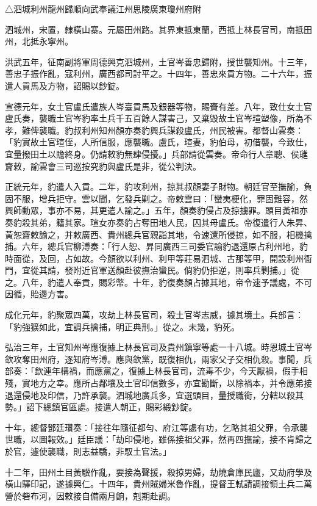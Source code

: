 
\begin{pinyinscope}
△泗城利州龍州歸順向武奉議江州思陵廣東瓊州府附

泗城州，宋置，隸橫山寨。元屬田州路。其界東抵東蘭，西抵上林長官司，南抵田州，北抵永寧州。

洪武五年，征南副將軍周德興克泗城州，土官岑善忠歸附，授世襲知州。十三年，善忠子振作亂，寇利州，廣西都司討平之。十四年，善忠來貢方物。二十六年，振遣人貢馬及方物，詔賜以鈔錠。

宣德元年，女土官盧氏遣族人岑臺貢馬及銀器等物，賜賚有差。八年，致仕女土官盧氏奏，襲職土官岑豹率土兵千五百餘人謀害己，又棄毀故土官岑瑄塑像，所為不孝，難俾襲職。豹叔利州知州顏亦奏豹興兵謀殺盧氏，州民被害。都督山雲奏：「豹實故土官瑄侄，人所信服，應襲職。盧氏，瑄妻，豹伯母，初借襲，今致仕，宜量撥田土以贍終身。仍請敕豹無肆侵擾。」兵部請從雲奏。帝命行人章聰、侯璡齎敕，諭雲會三司巡按究豹與盧氏是非，從公判決。

正統元年，豹遣人入貢。二年，豹攻利州，掠其叔顏妻子財物。朝廷官至撫諭，負固不服，增兵拒守。雲以聞，乞發兵剿之。帝敕雲曰：「蠻夷梗化，罪固難容，然興師動眾，事亦不易，其更遣人諭之。」五年，顏奏豹侵占及掠擄罪。頭目黃祖亦奏豹殺其弟，籍其家。瑄女亦奏豹占奪田地人民，囚其母盧氏。帝復遣行人朱昇、黃恕齋敕諭之，并敕廣西、貴州總兵官親詣其地，令速還所侵掠，如不服，相機擒捕。六年，總兵官柳溥奏：「行人恕、昇同廣西三司委官諭豹退還原占利州地，豹時面從，及回，占如故。今顏欲以利州、利甲等莊易泗城、古那等甲，開設利州衙門，宜從其請，發附近官軍送顏赴彼撫治蠻民。倘豹仍拒逆，則率兵剿捕。」從之。八年，豹遣人奉貢，賜彩幣。十年，豹復奏顏占據其地，帝令速予議處，不可因循，貽邊方害。

成化元年，豹聚眾四萬，攻劫上林長官司，殺土官岑志威，據其境土。兵部言：「豹強獷如此，宜調兵擒捕，明正典刑。」從之。未幾，豹死。

弘治三年，土官知州岑應復據上林長官司及貴州鎮寧等處一十八城。時恩城土官岑欽攻奪田州府，逐知府岑溥。應與欽黨，既復相仇，兩家父子交相仇殺。事聞，兵部奏：「欽連年構禍，而應黨之，復據上林長官司，流毒不少，今天厭禍，假手相殘，實地方之幸。應所占鄰壤及土官印信數多，亦宜勘斷，以除禍本，并令應弟接退還侵地及印信，乃許承襲。泗城地廣兵多，宜選頭目，量授職銜，分轄以殺其勢。」詔下總鎮官區處。接遣人朝正，賜彩緞鈔錠。

十年，總督鄧廷瓚奏：「接往年隨征都勻、府江等處有功，乞略其祖父罪，令承襲世職，以圖報效。」廷臣議：「劫印侵地，雖係接祖父罪，然再四撫諭，接不肯歸之於官，遽使襲職，則志益驕，非馭土官法。」

十二年，田州土目黃驥作亂，要接為聲援，殺掠男婦，劫燒倉庫民廬，又劫府學及橫山驛印記，遂據興仁。十四年，貴州賊婦米魯作亂，提督王軾請調接領土兵二萬營於砦布河，因敕接自備兩月餉，剋期赴調。


\end{pinyinscope}
